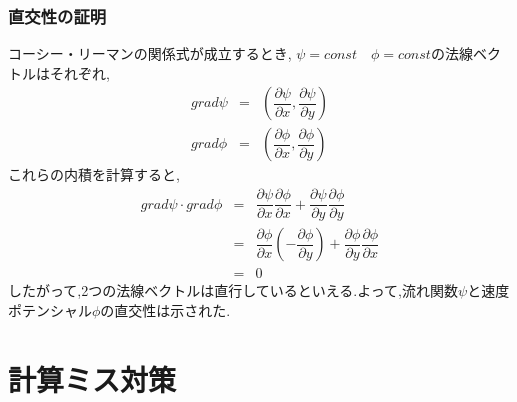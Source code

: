 \documentclass[a4paper]{jsarticle}
\begin{document}
\subsubsection{直交性の証明}
コーシー・リーマンの関係式が成立するとき,
$\psi=const\quad \phi=const$の法線ベクトルはそれぞれ,
\begin{eqnarray*}
    grad \psi&=&\left(\dfrac{\partial \psi}{\partial x}, \dfrac{\partial \psi}{\partial y}\right)\\
    grad \phi&=&\left(\dfrac{\partial \phi}{\partial x}, \dfrac{\partial \phi}{\partial y}\right)
\end{eqnarray*}
これらの内積を計算すると,
\begin{eqnarray*}
    grad\psi \cdot grad\phi &=& \dfrac{\partial \psi}{\partial x}\dfrac{\partial \phi}{\partial x} +\dfrac{\partial \psi}{\partial y}\dfrac{\partial \phi}{\partial y}\\
    &=&\dfrac{\partial \phi}{\partial x}\left(-\dfrac{\partial \phi}{\partial y}\right)+\dfrac{\partial \phi}{\partial y}\dfrac{\partial \phi}{\partial x}\\
    &=&0
\end{eqnarray*}
したがって,2つの法線ベクトルは直行しているといえる.よって,流れ関数$\psi$と速度ポテンシャル$\phi$の直交性は示された.
\newpage
\section{計算ミス対策}
\end{document}
